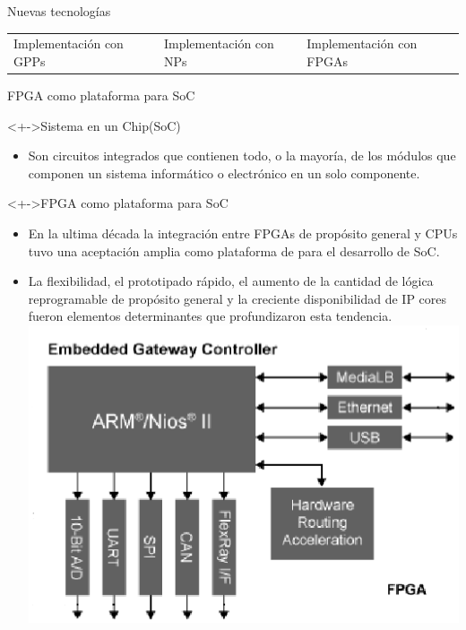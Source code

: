 \documentclass[xcolor=dvipsnames]{beamer}
\begin{document}
\begin{frame}{Nuevas tecnologías}
\begin{tabularx}{\linewidth}{VVV}
      \\
      \tiny Implementación con GPPs
      &
      \tiny Implementación con NPs
      &
      \tiny Implementación con FPGAs
      \\
    \end{tabularx}
\end{frame}

\begin{frame}{FPGA como plataforma para SoC}

  \begin{block}<+->{Sistema en un Chip(SoC)} 
    \begin{itemize}
      \scriptsize
      \item Son circuitos integrados que contienen todo, o la mayoría, de los módulos que componen un sistema informático o electrónico en un solo componente.
    \end{itemize}      
  \end{block}

  \begin{block}<+->{FPGA como plataforma para SoC} 
    \begin{itemize}
      \scriptsize
      \item En la ultima década la integración entre FPGAs de propósito general y CPUs tuvo una aceptación amplia como plataforma de para el desarrollo de SoC.    
	\item La flexibilidad, el prototipado rápido, el aumento de la cantidad de lógica reprogramable de propósito general y la creciente disponibilidad de IP cores fueron elementos determinantes que profundizaron esta tendencia.
	\center
        \includegraphics[scale=0.35]{figures/soc2.eps} 

    \end{itemize}      
  \end{block}
\end{frame}
\end{document}
